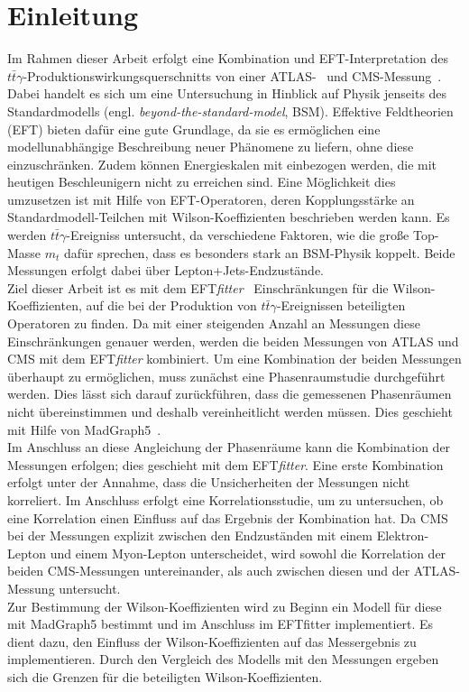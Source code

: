 \chapter{Einleitung}
Im Rahmen dieser Arbeit erfolgt eine Kombination und EFT-Interpretation des $t\bar{t}\gamma$-Produktionswirkungsquerschnitts von einer ATLAS-~\cite{Aaboud:2017era} und CMS-Messung~\cite{Sirunyan:2017iyh}. Dabei handelt es sich um eine Untersuchung in Hinblick auf Physik jenseits des Standardmodells (engl. \textit{beyond-the-standard-model}, BSM). Effektive Feldtheorien (EFT) bieten dafür eine gute Grundlage, da sie es ermöglichen eine modellunabhängige Beschreibung neuer Phänomene zu liefern, ohne diese einzuschränken. Zudem können Energieskalen mit einbezogen werden, die mit heutigen Beschleunigern nicht zu erreichen sind. Eine Möglichkeit dies umzusetzen ist mit Hilfe von EFT-Operatoren, deren Kopplungsstärke an Standardmodell-Teilchen mit Wilson-Koeffizienten beschrieben werden kann. Es werden $t\bar{t}\gamma$-Ereigniss untersucht, da verschiedene Faktoren, wie die große Top-Masse $m_t$ dafür sprechen, dass es besonders stark an BSM-Physik koppelt. Beide Messungen erfolgt dabei über Lepton+Jets-Endzustände.\\
Ziel dieser Arbeit ist es mit dem EFT\textit{fitter}~\cite{Castro:2016jjv} Einschränkungen für die Wilson-Koeffizienten, auf die bei der Produktion von $t\bar{t}\gamma$-Ereignissen beteiligten Operatoren zu finden. Da mit einer steigenden Anzahl an Messungen diese Einschränkungen genauer werden, werden die beiden Messungen von ATLAS und CMS mit dem EFT\textit{fitter} kombiniert.
Um eine Kombination der beiden Messungen überhaupt zu ermöglichen, muss zunächst eine Phasenraumstudie durchgeführt werden. Dies lässt sich darauf zurückführen, dass die gemessenen Phasenräumen nicht übereinstimmen und deshalb vereinheitlicht werden müssen. Dies geschieht mit Hilfe von MadGraph5~\cite{Alwall:2014hca}.\\
Im Anschluss an diese Angleichung der Phasenräume kann die Kombination der Messungen erfolgen; dies geschieht mit dem EFT\textit{fitter}. Eine erste Kombination erfolgt unter der Annahme, dass die Unsicherheiten der Messungen nicht korreliert. Im Anschluss erfolgt eine Korrelationsstudie, um zu untersuchen, ob eine Korrelation einen Einfluss auf das Ergebnis der Kombination hat. Da CMS bei der Messungen explizit zwischen den Endzuständen mit einem Elektron-Lepton und einem Myon-Lepton unterscheidet, wird sowohl die Korrelation der beiden CMS-Messungen untereinander, als auch zwischen diesen und der ATLAS-Messung untersucht.\\
Zur Bestimmung der Wilson-Koeffizienten wird zu Beginn ein Modell für diese mit MadGraph5 bestimmt und im Anschluss im EFTfitter implementiert. Es dient dazu, den Einfluss der Wilson-Koeffizienten auf das Messergebnis zu implementieren. Durch den Vergleich des Modells mit den Messungen ergeben sich die Grenzen für die beteiligten Wilson-Koeffizienten.
